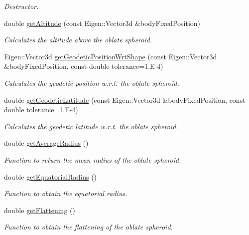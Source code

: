\begin{DoxyCompactItemize}
\begin{DoxyCompactList}\small\item\em Destructor. \end{DoxyCompactList}\item 
double \hyperlink{classtudat_1_1basic__astrodynamics_1_1OblateSpheroidBodyShapeModel_a9a4e37d448cb35c1a34259a11832eeb0}{get\+Altitude} (const Eigen\+::\+Vector3d \&body\+Fixed\+Position)
\begin{DoxyCompactList}\small\item\em Calculates the altitude above the oblate spheroid. \end{DoxyCompactList}\item 
Eigen\+::\+Vector3d \hyperlink{classtudat_1_1basic__astrodynamics_1_1OblateSpheroidBodyShapeModel_aded23b1755f1cc33dacaa0c4b9544bf6}{get\+Geodetic\+Position\+Wrt\+Shape} (const Eigen\+::\+Vector3d \&body\+Fixed\+Position, const double tolerance=1.\+E-\/4)
\begin{DoxyCompactList}\small\item\em Calculates the geodetic position w.\+r.\+t. the oblate spheroid. \end{DoxyCompactList}\item 
double \hyperlink{classtudat_1_1basic__astrodynamics_1_1OblateSpheroidBodyShapeModel_a3d69a2f5417e69eadac8e2ced7b2a131}{get\+Geodetic\+Latitude} (const Eigen\+::\+Vector3d \&body\+Fixed\+Position, const double tolerance=1.\+E-\/4)
\begin{DoxyCompactList}\small\item\em Calculates the geodetic latitude w.\+r.\+t. the oblate spheroid. \end{DoxyCompactList}\item 
double \hyperlink{classtudat_1_1basic__astrodynamics_1_1OblateSpheroidBodyShapeModel_ad7f4f8bc028731164d1ae39a373e39a7}{get\+Average\+Radius} ()
\begin{DoxyCompactList}\small\item\em Function to return the mean radius of the oblate spheroid. \end{DoxyCompactList}\item 
double \hyperlink{classtudat_1_1basic__astrodynamics_1_1OblateSpheroidBodyShapeModel_a25c7eeff7bb98a99860b71872b8365e0}{get\+Equatorial\+Radius} ()
\begin{DoxyCompactList}\small\item\em Function to obtain the equatorial radius. \end{DoxyCompactList}\item 
double \hyperlink{classtudat_1_1basic__astrodynamics_1_1OblateSpheroidBodyShapeModel_a15a0caded02c3b00dd14dbf2e344995b}{get\+Flattening} ()
\begin{DoxyCompactList}\small\item\em Function to obtain the flattening of the oblate spheroid. \end{DoxyCompactList}\end{DoxyCompactItemize}


